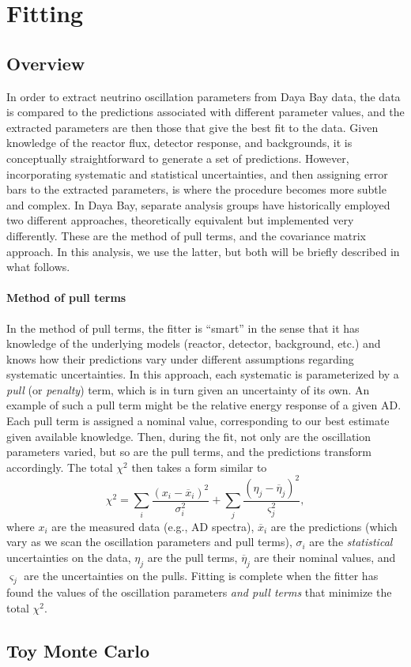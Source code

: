 \documentclass[../thesis.tex]{subfiles}
\begin{document}
\chapter{Fitting}
\label{chap:fitting}

\section{Overview}
\label{sec:fitoverview}

In order to extract neutrino oscillation parameters from Daya Bay data, the data is compared to the predictions associated with different parameter values, and the extracted parameters are then those that give the best fit to the data. Given knowledge of the reactor flux, detector response, and backgrounds, it is conceptually straightforward to generate a set of predictions. However, incorporating systematic and statistical uncertainties, and then assigning error bars to the extracted parameters, is where the procedure becomes more subtle and complex. In Daya Bay, separate analysis groups have historically employed two different approaches, theoretically equivalent but implemented very differently. These are the method of pull terms, and the covariance matrix approach. In this analysis, we use the latter, but both will be briefly described in what follows.

\subsubsection{Method of pull terms}
\label{sec:pullterms}

In the method of pull terms, the fitter is ``smart'' in the sense that it has knowledge of the underlying models (reactor, detector, background, etc.) and knows how their predictions vary under different assumptions regarding systematic uncertainties. In this approach, each systematic is parameterized by a \emph{pull} (or \emph{penalty}) term, which is in turn given an uncertainty of its own. An example of such a pull term might be the relative energy response of a given AD. Each pull term is assigned a nominal value, corresponding to our best estimate given available knowledge. Then, during the fit, not only are the oscillation parameters varied, but so are the pull terms, and the predictions transform accordingly. The total $\chi^2$ then takes a form similar to
\[ \chi^2 = \sum_i \frac{(x_i - \overline x_i)^2}{\sigma_i^2}
  + \sum_j \frac{(\eta_j - \overline \eta_j)^2}{\varsigma_j^2}, \]
where $x_i$ are the measured data (e.g., AD spectra), $\overline x_i$ are the predictions (which vary as we scan the oscillation parameters and pull terms), $\sigma_i$ are the \emph{statistical} uncertainties on the data, $\eta_j$ are the pull terms, $\overline \eta_j$ are their nominal values, and $\varsigma_j$ are the uncertainties on the pulls. Fitting is complete when the fitter has found the values of the oscillation parameters \emph{and pull terms} that minimize the total $\chi^2$.

\section{Toy Monte Carlo}
\label{sec:toymc}
\end{document}
